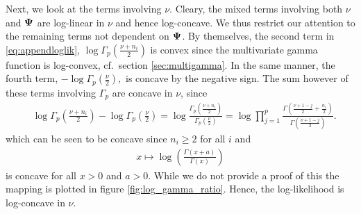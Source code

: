 \documentclass{article}\usepackage[]{graphicx}\usepackage[]{color}
\begin{document}
Next, we look at the terms involving $\nu$.
Cleary, the mixed terms involving both $\nu$ and ${\boldsymbol{\Psi}}$ are log-linear in $\nu$ and hence log-concave.
We thus restrict our attention to the remaining terms not dependent on ${\boldsymbol{\Psi}}$.
By themselves, the second term in \eqref{eq:appendloglik},
$
\log \Gamma_p\!\left(\frac{\nu + n_i}{2}\right)
$
is convex since the multivariate gamma function is log-convex, cf.\ section \ref{sec:multigamma}.
In the same manner, the fourth term,
$
  - \log \Gamma_p\!\left(\frac{\nu}{2}\right),
$
is concave by the negative sign.
The sum however of these terms involving $\Gamma_p$ are concave in $\nu$, since
\begin{align*}
  &\log\Gamma_p\!\left( \frac{\nu + n_i}{2} \right) -
    \log\Gamma_p\!\left( \frac{\nu}{2} \right)
  =  \log\frac{\Gamma_p\!\left( \frac{\nu + n_i}{2} \right)}{
                \Gamma_p\!\left( \frac{\nu}{2}       \right)}
  = \log \prod_{j = 1}^p
    \frac{\Gamma\!\left( \frac{\nu + 1 - j}{2} + \frac{n_i}{2} \right)}{
          \Gamma\!\left( \frac{\nu + 1 - j}{2} \right)}.
\end{align*}
which can be seen to be concave since $n_i \geq 2$ for all $i$ and
\begin{align}
  x \mapsto \log\left(\frac{\Gamma(x + a)}{\Gamma(x)}\right)
  \label{eq:logGammaRatio}
\end{align}
is concave for all $x>0$ and $a > 0$. While we do not provide a proof of this the mapping is plotted in figure \ref{fig:log_gamma_ratio}.
Hence, the log-likelihood is log-concave in $\nu$.
\end{document}
